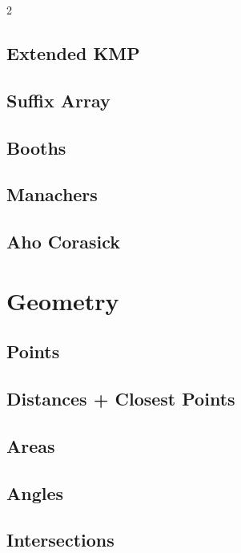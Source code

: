 \documentclass[10pt, a4paper]{article}
\begin{document}
\begin{landscape}
\begin{multicols}{2}
\subsection{Extended KMP}
\raggedbottom
\subsection{Suffix Array}
\raggedbottom
\subsection{Booths}
\raggedbottom
\subsection{Manachers}
\raggedbottom
\subsection{Aho Corasick}
\raggedbottom

\section{Geometry}
\subsection{Points}
\raggedbottom
\subsection{Distances + Closest Points}
\raggedbottom
\subsection{Areas}
\raggedbottom
\subsection{Angles}
\raggedbottom
\subsection{Intersections}
\raggedbottom

\end{multicols}
\end{landscape}
\end{document}
